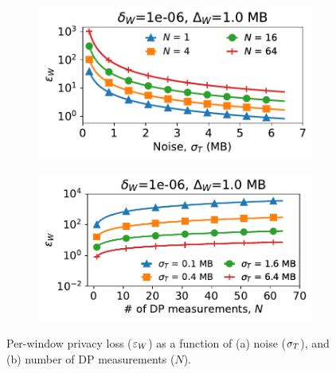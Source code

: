 \begin{figure}[t]
  \centering
  \begin{subfigure}{0.49\columnwidth}
      \centering
      \includegraphics[width=\textwidth]{plots/privacy_loss_VS_noise_std_video.pdf}
      \caption{}
      \label{subfig:high-sensitivity-epsilon-sigma}
  \end{subfigure}
  \hfill
  \begin{subfigure}{0.49\columnwidth}
      \centering
      \includegraphics[width=\textwidth]{plots/privacy_loss_VS_query_num_video.pdf}
      \caption{}
      \label{subfig:high-sensitivity-epsilon-queries}
  \end{subfigure}
  \caption{
    Per-window privacy loss ($\varepsilon_{W}$) as a function of
    (a) noise ($\sigma_T$), and (b) number of DP measurements ($N$).
  }
  \label{fig:privacy-microbenchmarks-high-sensitivity}
\end{figure}



